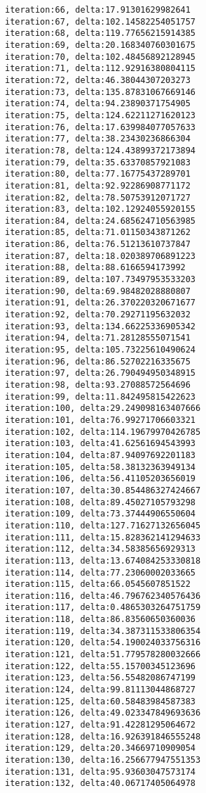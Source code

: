 \documentclass[11pt]{article}
\begin{document}
\begin{Verbatim}[commandchars=\\\{\}]
iteration:66, delta:17.91301629982641
iteration:67, delta:102.14582254051757
iteration:68, delta:119.77656215914385
iteration:69, delta:20.168340760301675
iteration:70, delta:102.48456892128945
iteration:71, delta:112.92916380804115
iteration:72, delta:46.38044307203273
iteration:73, delta:135.87831067669146
iteration:74, delta:94.23890371754905
iteration:75, delta:124.62211271620123
iteration:76, delta:17.639984077057633
iteration:77, delta:38.23430236866304
iteration:78, delta:124.43899372173894
iteration:79, delta:35.63370857921083
iteration:80, delta:77.16775437289701
iteration:81, delta:92.92286908771172
iteration:82, delta:78.50753912071727
iteration:83, delta:102.12924055920155
iteration:84, delta:24.685624710563985
iteration:85, delta:71.01150343871262
iteration:86, delta:76.51213610737847
iteration:87, delta:18.020389706891223
iteration:88, delta:88.6166594173992
iteration:89, delta:107.73497953533203
iteration:90, delta:69.98482028880807
iteration:91, delta:26.370220320671677
iteration:92, delta:70.29271195632032
iteration:93, delta:134.66225336905342
iteration:94, delta:71.28128555071541
iteration:95, delta:105.73225610490624
iteration:96, delta:86.52702216335675
iteration:97, delta:26.790494950348915
iteration:98, delta:93.27088572564696
iteration:99, delta:11.842495815422623
iteration:100, delta:29.249098163407666
iteration:101, delta:76.99271706603321
iteration:102, delta:114.19679970426785
iteration:103, delta:41.62561694543993
iteration:104, delta:87.94097692201183
iteration:105, delta:58.38132363949134
iteration:106, delta:56.41105203656019
iteration:107, delta:30.854486327424667
iteration:108, delta:89.45027105793298
iteration:109, delta:73.37444906550604
iteration:110, delta:127.71627132656045
iteration:111, delta:15.828362141294633
iteration:112, delta:34.58385656929313
iteration:113, delta:13.674084253330818
iteration:114, delta:77.23060002033665
iteration:115, delta:66.0545607851522
iteration:116, delta:46.796762340576436
iteration:117, delta:0.4865303264751759
iteration:118, delta:86.83560650360036
iteration:119, delta:34.387311533806354
iteration:120, delta:54.190024033756316
iteration:121, delta:51.779578280032666
iteration:122, delta:55.15700345123696
iteration:123, delta:56.55482086747199
iteration:124, delta:99.81113044868727
iteration:125, delta:60.58483984587383
iteration:126, delta:49.023347849693636
iteration:127, delta:91.42281295064672
iteration:128, delta:16.926391846555248
iteration:129, delta:20.34669710909054
iteration:130, delta:16.256677947551353
iteration:131, delta:95.93603047573174
iteration:132, delta:40.06717405064978

\end{Verbatim}
\end{document}
